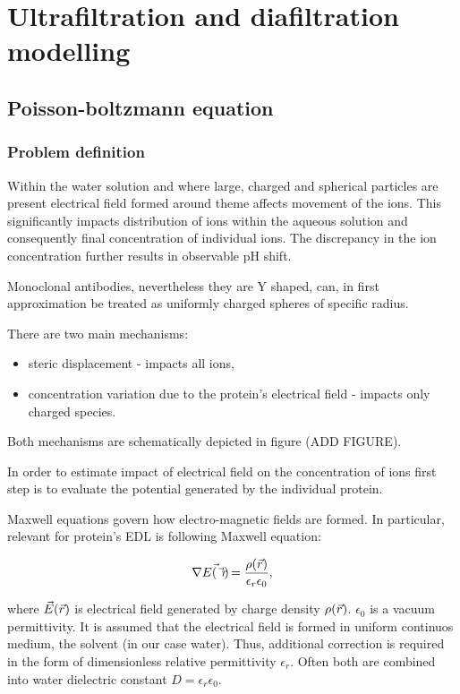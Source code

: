 \section{Ultrafiltration and diafiltration modelling}

\subsection{Poisson-boltzmann equation}

\subsubsection{Problem definition}

Within the water solution and where large, charged and spherical particles are present electrical
field formed around theme affects movement of the ions. This significantly impacts distribution
of ions within the aqueous solution and consequently final concentration of individual ions.
The discrepancy in the ion concentration further results in observable pH shift.

Monoclonal antibodies, nevertheless they are Y shaped, can, in first approximation be treated
as uniformly charged spheres of specific radius.

There are two main mechanisms:
\begin{itemize}
    \item steric displacement - impacts all ions,
    \item concentration variation due to the protein's electrical field - impacts only charged species.
\end{itemize}

Both mechanisms are schematically depicted in figure (ADD FIGURE).

In order to estimate impact of electrical field on the concentration of ions first step is to
evaluate the potential generated by the individual protein.

Maxwell equations govern how electro-magnetic fields are formed. In particular, relevant for
protein's EDL is following Maxwell equation:

\begin{equation}
    \nabla \vec{E(\vec{r})} = \frac{\rho(\vec{r})}{\epsilon_r\epsilon_0},
\end{equation}

where $\vec{E}(\vec{r})$ is electrical field generated by charge density $\rho(\vec{r})$.
$\epsilon_0$ is a vacuum permittivity. It is assumed that the electrical field is formed in
uniform continuos medium, the solvent (in our case water). Thus, additional
correction is required in the form of dimensionless relative permittivity $\epsilon_r$.
Often both are combined into water dielectric constant $D= \epsilon_r\epsilon_0$.

